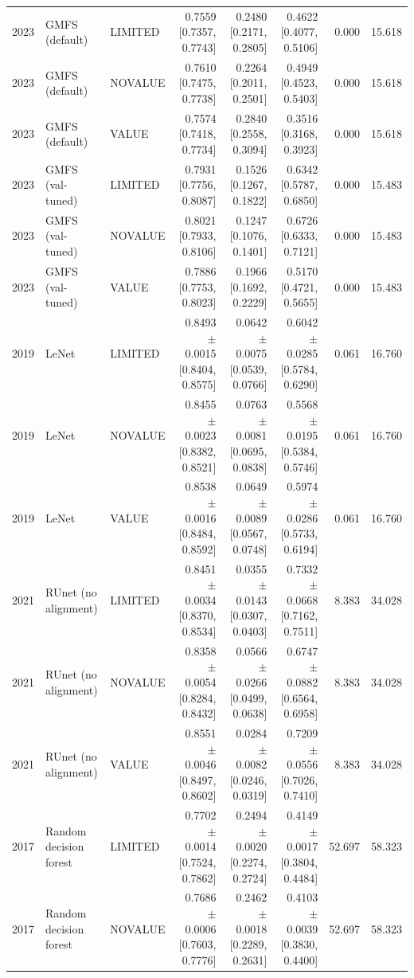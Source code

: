 \begin{table}[t]
\begin{tabular}{lllrrrrr}
2023 & GMFS (default) & LIMITED & 0.7559 [0.7357, 0.7743] & 0.2480 [0.2171, 0.2805] & 0.4622 [0.4077, 0.5106] & 0.000 & 15.618 \\
2023 & GMFS (default) & NOVALUE & 0.7610 [0.7475, 0.7738] & 0.2264 [0.2011, 0.2501] & 0.4949 [0.4523, 0.5403] & 0.000 & 15.618 \\
2023 & GMFS (default) & VALUE & 0.7574 [0.7418, 0.7734] & 0.2840 [0.2558, 0.3094] & 0.3516 [0.3168, 0.3923] & 0.000 & 15.618 \\
2023 & GMFS (val-tuned) & LIMITED & 0.7931 [0.7756, 0.8087] & 0.1526 [0.1267, 0.1822] & 0.6342 [0.5787, 0.6850] & 0.000 & 15.483 \\
2023 & GMFS (val-tuned) & NOVALUE & 0.8021 [0.7933, 0.8106] & 0.1247 [0.1076, 0.1401] & 0.6726 [0.6333, 0.7121] & 0.000 & 15.483 \\
2023 & GMFS (val-tuned) & VALUE & 0.7886 [0.7753, 0.8023] & 0.1966 [0.1692, 0.2229] & 0.5170 [0.4721, 0.5655] & 0.000 & 15.483 \\
2019 & LeNet & LIMITED & 0.8493 $\pm$ 0.0015 [0.8404, 0.8575] & 0.0642 $\pm$ 0.0075 [0.0539, 0.0766] & 0.6042 $\pm$ 0.0285 [0.5784, 0.6290] & 0.061 & 16.760 \\
2019 & LeNet & NOVALUE & 0.8455 $\pm$ 0.0023 [0.8382, 0.8521] & 0.0763 $\pm$ 0.0081 [0.0695, 0.0838] & 0.5568 $\pm$ 0.0195 [0.5384, 0.5746] & 0.061 & 16.760 \\
2019 & LeNet & VALUE & 0.8538 $\pm$ 0.0016 [0.8484, 0.8592] & 0.0649 $\pm$ 0.0089 [0.0567, 0.0748] & 0.5974 $\pm$ 0.0286 [0.5733, 0.6194] & 0.061 & 16.760 \\
2021 & RUnet (no alignment) & LIMITED & 0.8451 $\pm$ 0.0034 [0.8370, 0.8534] & 0.0355 $\pm$ 0.0143 [0.0307, 0.0403] & 0.7332 $\pm$ 0.0668 [0.7162, 0.7511] & 8.383 & 34.028 \\
2021 & RUnet (no alignment) & NOVALUE & 0.8358 $\pm$ 0.0054 [0.8284, 0.8432] & 0.0566 $\pm$ 0.0266 [0.0499, 0.0638] & 0.6747 $\pm$ 0.0882 [0.6564, 0.6958] & 8.383 & 34.028 \\
2021 & RUnet (no alignment) & VALUE & 0.8551 $\pm$ 0.0046 [0.8497, 0.8602] & 0.0284 $\pm$ 0.0082 [0.0246, 0.0319] & 0.7209 $\pm$ 0.0556 [0.7026, 0.7410] & 8.383 & 34.028 \\
2017 & Random decision forest & LIMITED & 0.7702 $\pm$ 0.0014 [0.7524, 0.7862] & 0.2494 $\pm$ 0.0020 [0.2274, 0.2724] & 0.4149 $\pm$ 0.0017 [0.3804, 0.4484] & 52.697 & 58.323 \\
2017 & Random decision forest & NOVALUE & 0.7686 $\pm$ 0.0006 [0.7603, 0.7776] & 0.2462 $\pm$ 0.0018 [0.2289, 0.2631] & 0.4103 $\pm$ 0.0039 [0.3830, 0.4400] & 52.697 & 58.323 \\

\end{tabular}
\end{table}
